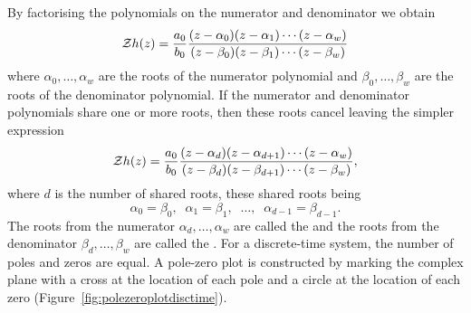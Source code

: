 By factorising the polynomials on the numerator and denominator we obtain
\[
{\mathcal Z} h(z) = \frac{a_0}{b_0} \frac{(z-\alpha_0)(z - \alpha_1)\cdots(z - \alpha_{w})}{(z-\beta_0)(z - \beta_1)\cdots(z - \beta_{w})}
\]
where $\alpha_0, \dots, \alpha_w$ are the roots of the numerator polynomial and $\beta_0, \dots, \beta_w$ are the roots of the denominator polynomial.  If the numerator and denominator polynomials share one or more roots, then these roots cancel leaving the simpler expression
\begin{equation}\label{eq:ztransfuncpoleszeros}
{\mathcal Z} h(z) = \frac{a_0}{b_0} \frac{(z-\alpha_d)(z - \alpha_{d+1})\cdots(z - \alpha_{w})}{(z-\beta_d)(z - \beta_{d+1})\cdots(z - \beta_{w})},
\end{equation}
where $d$ is the number of shared roots, these shared roots being 
\[
\alpha_0 = \beta_0, \;\; \alpha_1 = \beta_1, \;\; \dots, \;\;  \alpha_{d-1} = \beta_{d-1}.
\]
The roots from the numerator $\alpha_d, \dots, \alpha_w$ are called the  and the roots from the denominator $\beta_d, \dots, \beta_w$ are called the .  For a discrete-time system, the number of poles and zeros are equal.   A pole-zero plot is constructed by marking the complex plane with a cross at the location of each pole and a circle at the location of each zero (Figure~\ref{fig:polezeroplotdisctime}). %

